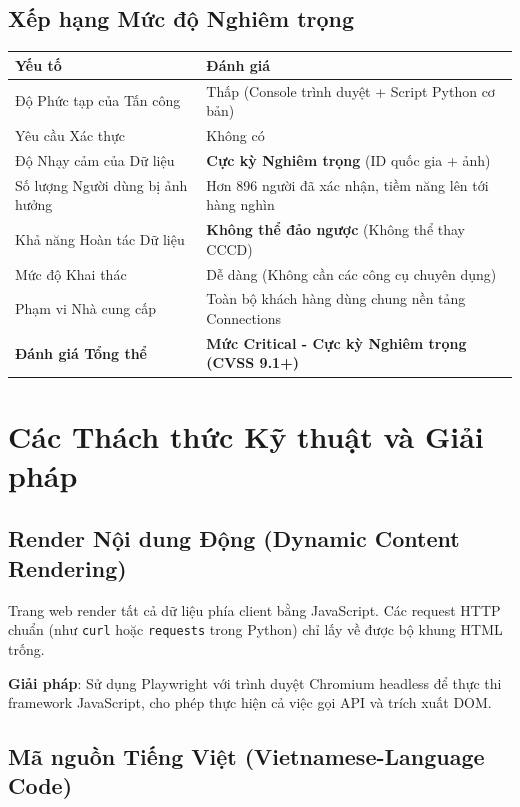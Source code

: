 \documentclass[12pt,a4paper]{article}
\begin{document}
\subsection{Xếp hạng Mức độ Nghiêm trọng}

\begin{table}[H]
\centering
\begin{tabular}{@{}ll@{}}
\toprule
\textbf{Yếu tố} & \textbf{Đánh giá} \\
\midrule
Độ Phức tạp của Tấn công & Thấp (Console trình duyệt + Script Python cơ bản) \\
Yêu cầu Xác thực & Không có \\
Độ Nhạy cảm của Dữ liệu & \textbf{Cực kỳ Nghiêm trọng} (ID quốc gia + ảnh) \\
Số lượng Người dùng bị ảnh hưởng & Hơn 896 người đã xác nhận, tiềm năng lên tới hàng nghìn \\
Khả năng Hoàn tác Dữ liệu & \textbf{Không thể đảo ngược} (Không thể thay CCCD) \\
Mức độ Khai thác & Dễ dàng (Không cần các công cụ chuyên dụng) \\
Phạm vi Nhà cung cấp & Toàn bộ khách hàng dùng chung nền tảng Connections \\
\textbf{Đánh giá Tổng thể} & \textbf{Mức Critical - Cực kỳ Nghiêm trọng (CVSS 9.1+)} \\
\bottomrule
\end{tabular}
\end{table}

\section{Các Thách thức Kỹ thuật và Giải pháp}
\label{sec:challenges}

\subsection{Render Nội dung Động (Dynamic Content Rendering)}

Trang web render tất cả dữ liệu phía client bằng JavaScript. Các request HTTP chuẩn (như \texttt{curl} hoặc \texttt{requests} trong Python) chỉ lấy về được bộ khung HTML trống.

\textbf{Giải pháp}: Sử dụng Playwright với trình duyệt Chromium headless để thực thi framework JavaScript, cho phép thực hiện cả việc gọi API và trích xuất DOM.

\subsection{Mã nguồn Tiếng Việt (Vietnamese-Language Code)}
\end{document}
